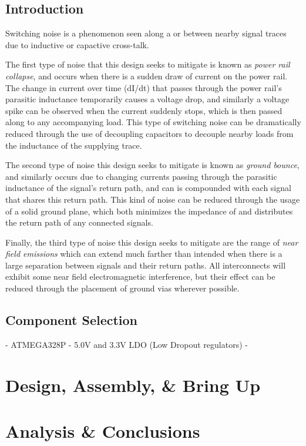 \documentclass{article}
\newcommand*{\Indent}{\hspace*{1cm}}
\begin{document}
\subsection*{Introduction}
Switching noise is a phenomenon seen along a or between nearby signal traces due to inductive or capactive cross-talk. 

\Indent The first type of noise that this design seeks to mitigate is known as \textit{power rail collapse}, and occurs when there is a sudden draw of current on the power rail.
The change in current over time (dI/dt) that passes through the power rail's parasitic inductance temporarily causes a voltage drop, and similarly a voltage spike can be observed when the current suddenly stops, which is then passed along to any accompanying load.
This type of switching noise can be dramatically reduced through the use of decoupling capacitors to decouple nearby loads from the inductance of the supplying trace.

\Indent The second type of noise this design seeks to mitigate is known as \textit{ground bounce}, and similarly occurs due to changing currents passing through the parasitic inductance of the signal's return path, and can is compounded with each signal that shares this return path. 
This kind of noise can be reduced through the usage of a solid ground plane, which both minimizes the impedance of and distributes the return path of any connected signals.

\Indent Finally, the third type of noise this design seeks to mitigate are the range of \textit{near field emissions} which can extend much farther than intended when there is a large separation between signals and their return paths.
All interconnects will exhibit some near field electromagnetic interference, but their effect can be reduced through the placement of ground vias wherever possible.

\subsection*{Component Selection}
- ATMEGA328P
- 5.0V and 3.3V LDO (Low Dropout regulators)
- 

\section*{Design, Assembly, \& Bring Up}

\section*{Analysis \& Conclusions}
\end{document}
